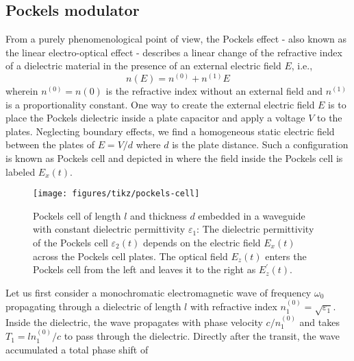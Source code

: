 
\subsection{Pockels modulator}


From a purely phenomenological point of view, the Pockels effect - also known as the linear electro-optical effect - describes a linear change of the refractive index of a dielectric material in the presence of an external electric field $E$, i.e.,
\begin{equation}
	n(E)
	=
	n^{(0)}
	+
	n^{(1)}E
\end{equation}
wherein $n^{(0)}=n(0)$ is the refractive index without an external field and $n^{(1)}$ is a proportionality constant.
One way to create the external electric field $E$ is to place the Pockels dielectric inside a plate capacitor and apply a voltage $V$ to the plates.
Neglecting boundary effects, we find a homogeneous static electric field between the plates of $E=V/d$ where $d$ is the plate distance.
Such a configuration is known as Pockels cell and depicted in  where the field inside the Pockels cell is labeled $E_x(t)$.
\begin{figure}[htb]
    \centering
    \texttt{[image: figures/tikz/pockels-cell]}
    \caption{Pockels cell of length $l$ and thickness $d$ embedded in a waveguide with constant dielectric permittivity $\varepsilon_1$: The dielectric permittivity of the Pockels cell $\varepsilon_2(t)$ depends on the electric field $E_x(t)$ across the Pockels cell plates. The optical field $E_z(t)$ enters the Pockels cell from the left and leaves it to the right as $E^\prime_z(t)$.}\label{fig:pockels_cell}
\end{figure}
Let us first consider a monochromatic electromagnetic wave of frequency $\omega_0$ propagating through a dielectric of length $l$ with refractive index $n_1^{(0)}=\sqrt{\varepsilon_1}$.
Inside the dielectric, the wave propagates with phase velocity $c/n_1^{(0)}$ and takes $T_1=ln_1^{(0)}/c$ to pass through the dielectric.
Directly after the transit, the wave accumulated a total phase shift of
